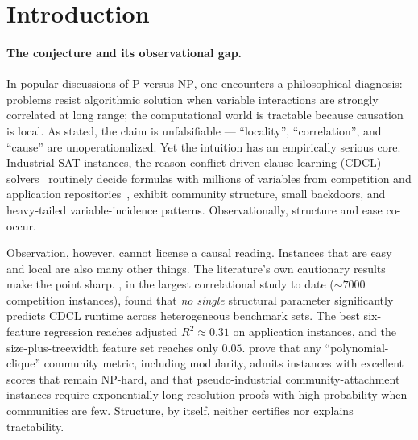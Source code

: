 \documentclass[pdflatex,sn-basic,Numbered]{sn-jnl}
\begin{document}

\section{Introduction}
\label{sec:intro}

\paragraph{The conjecture and its observational gap.}
In popular discussions of \textsc{P} versus \textsc{NP}, one encounters a
philosophical diagnosis: problems resist algorithmic solution when variable
interactions are strongly correlated at long range; the computational world is
tractable because causation is local. As stated, the claim is unfalsifiable
--- ``locality'', ``correlation'', and ``cause'' are unoperationalized. Yet the
intuition has an empirically serious core. Industrial SAT instances, the
reason conflict-driven clause-learning (CDCL) solvers~\cite{marques2009}
routinely decide formulas with millions of variables from competition and
application repositories~\cite{satcomp}, exhibit community structure, small
backdoors, and heavy-tailed variable-incidence patterns. Observationally,
structure and ease co-occur.

Observation, however, cannot license a causal reading. Instances that are easy
and local are also many other things. The literature's own cautionary results
make the point sharp. \citet{zulkoski2018}, in the largest
correlational study to date (${\sim}7000$ competition instances), found that
\emph{no single} structural parameter significantly predicts CDCL runtime
across heterogeneous benchmark sets. The best six-feature regression reaches
adjusted $R^2 \approx 0.31$ on application instances, and the
size-plus-treewidth feature set reaches only $0.05$. \citet{mull2016} prove that
any ``polynomial-clique'' community metric, including modularity, admits
instances with excellent scores that remain \textsc{NP}-hard, and that
pseudo-industrial community-attachment instances require exponentially long
resolution proofs with high probability when communities are few. Structure,
by itself, neither certifies nor explains tractability.
\end{document}
